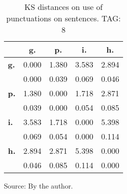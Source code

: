\begin{table}[h!]
\begin{center}
\caption{KS distances on use of punctuations on sentences. TAG: 8}
	\label{tab:kolPct}
\begin{tabular}{| l || c | c | c | c |}\hline
 & {\bf g.} & {\bf p.} & {\bf i.} & {\bf h.} \\\hline\hline
{\bf g.} & 0.000 & 1.380 & 3.583 & 2.894 \\
{\bf } & 0.000 & 0.039 & 0.069 & 0.046 \\\hline
{\bf p.} & 1.380 & 0.000 & 1.718 & 2.871 \\
{\bf } & 0.039 & 0.000 & 0.054 & 0.085 \\\hline
{\bf i.} & 3.583 & 1.718 & 0.000 & 5.398 \\
{\bf } & 0.069 & 0.054 & 0.000 & 0.114 \\\hline
{\bf h.} & 2.894 & 2.871 & 5.398 & 0.000 \\
{\bf } & 0.046 & 0.085 & 0.114 & 0.000 \\\hline
\end{tabular}
\begin{flushleft}\footnotesize
		Source: By the author.\
\end{flushleft}
\end{center}
\end{table}
